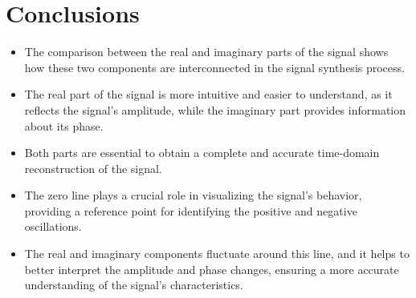 \documentclass[12pt]{article}
\begin{document}
\FloatBarrier
\vfill


\newpage

\section{Conclusions}

\begin{itemize}
    \item The comparison between the real and imaginary parts of the signal shows how these two components are interconnected in the signal synthesis process.
    \item The real part of the signal is more intuitive and easier to understand, as it reflects the signal's amplitude, while the imaginary part provides information about its phase.
    \item Both parts are essential to obtain a complete and accurate time-domain reconstruction of the signal.
    \item The zero line plays a crucial role in visualizing the signal's behavior, providing a reference point for identifying the positive and negative oscillations.
    \item The real and imaginary components fluctuate around this line, and it helps to better interpret the amplitude and phase changes, ensuring a more accurate understanding of the signal's characteristics.
\end{itemize}
\end{document}
